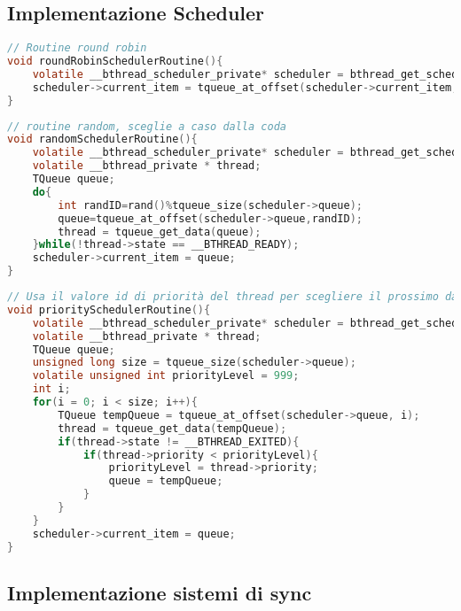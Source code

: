 \documentclass{article}
\begin{document}
\subsection{Implementazione Scheduler}
\vspace{2mm}
\begin{lstlisting}[language=C]
// Routine round robin
void roundRobinSchedulerRoutine(){
    volatile __bthread_scheduler_private* scheduler = bthread_get_scheduler();
    scheduler->current_item = tqueue_at_offset(scheduler->current_item, 1);
}
\end{lstlisting}
\begin{lstlisting}[language=C]
// routine random, sceglie a caso dalla coda
void randomSchedulerRoutine(){
    volatile __bthread_scheduler_private* scheduler = bthread_get_scheduler();
    volatile __bthread_private * thread;
    TQueue queue;
    do{
        int randID=rand()%tqueue_size(scheduler->queue);
        queue=tqueue_at_offset(scheduler->queue,randID);
        thread = tqueue_get_data(queue);
    }while(!thread->state == __BTHREAD_READY);
    scheduler->current_item = queue;
}
\end{lstlisting}
\begin{lstlisting}[language=C]
// Usa il valore id di priorità del thread per scegliere il prossimo da eseguire.
void prioritySchedulerRoutine(){
    volatile __bthread_scheduler_private* scheduler = bthread_get_scheduler();
    volatile __bthread_private * thread;
    TQueue queue;
    unsigned long size = tqueue_size(scheduler->queue);
    volatile unsigned int priorityLevel = 999;
    int i;
    for(i = 0; i < size; i++){
        TQueue tempQueue = tqueue_at_offset(scheduler->queue, i);
        thread = tqueue_get_data(tempQueue);
        if(thread->state != __BTHREAD_EXITED){
            if(thread->priority < priorityLevel){
                priorityLevel = thread->priority;
                queue = tempQueue;
            }
        }
    }
    scheduler->current_item = queue;
}
\end{lstlisting}
\subsection{Implementazione sistemi di sync}
\vspace{2mm}

\end{document}
